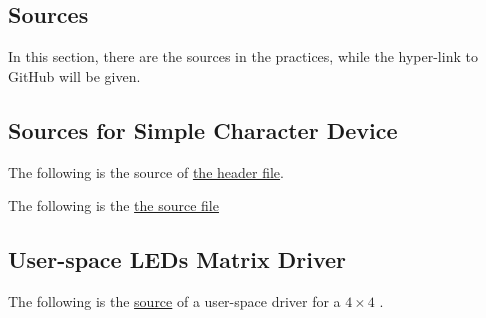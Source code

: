 \documentclass{report}
\begin{document}
    \begin{appendix}
        \chapter{Sources}
        \label{achap:source}
        In this section, there are the sources in the practices, while the hyper-link to GitHub will be given.
        
        \section{Sources for Simple Character Device}
        \label{src:scd}
        
        The following is the source of%
        \href{https://github.com/Qinka/embedded-system-design-homework/blob/master/practice1/led.h}{the header file}.
        
        
        The following is the%
        \href{https://github.com/Qinka/embedded-system-design-homework/blob/master/practice1/led.c}{the source file}
        
        
        
        \section{User-space LEDs Matrix Driver}
        \label{src:uslmd}
        
        The following is the \href{https://github.com/Qinka/embedded-system-design-homework/blob/master/led_daemon/daemon.c}{source} of a user-space driver for a $4 \times 4$ .
        
         
    \end{appendix}
    
    
\end{document}

